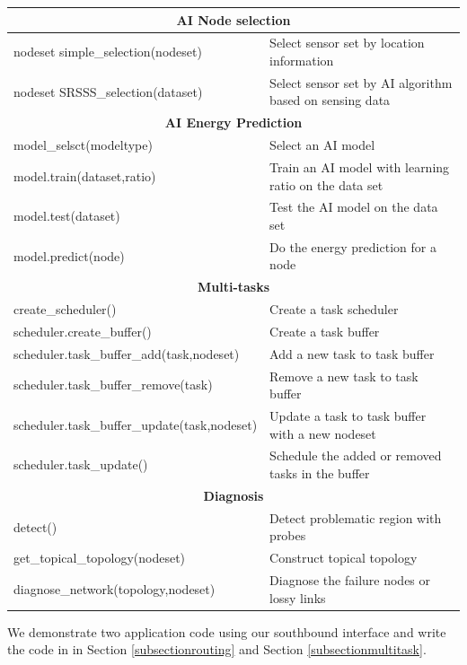 \begin{table}[!b]
{\begin{tabular}{|l|l|}
		\hline
		\multicolumn{2}{|c|}{\textbf{AI Node selection}}\\
		\hline
		\hline
		nodeset simple\_selection(nodeset) & Select sensor set by location information\\
		\hline
		nodeset SRSSS\_selection(dataset) & Select sensor set by AI algorithm based on sensing data\\
		\hline
		\multicolumn{2}{|c|}{\textbf{AI Energy Prediction}}\\
		\hline
		\hline
		model\_selsct(modeltype) & Select an AI model\\
		\hline
		model.train(dataset,ratio) & Train an AI model with learning ratio on the data set\\
		\hline
		model.test(dataset) & Test the AI model on the data set\\
		\hline
		model.predict(node) & Do the energy prediction for a node \\
		\hline
		\multicolumn{2}{|c|}{\textbf{Multi-tasks}}\\
		\hline
		\hline
		create\_scheduler() & Create a task scheduler \\
		\hline
		scheduler.create\_buffer() & Create a task buffer \\
		\hline
		scheduler.task\_buffer\_add(task,nodeset) & Add a new task to task buffer \\
		\hline
		scheduler.task\_buffer\_remove(task) & Remove a new task to task buffer \\
		\hline
		scheduler.task\_buffer\_update(task,nodeset) & Update a task to task buffer with a new nodeset \\
		\hline
		scheduler.task\_update() & Schedule the added or removed tasks in the buffer\\
		\hline
		\multicolumn{2}{|c|}{\textbf{Diagnosis}}\\
		\hline
		\hline
		detect() & Detect problematic region with probes \\
		\hline
		get\_topical\_topology(nodeset) & Construct topical topology\\
		\hline
		diagnose\_network(topology,nodeset) & Diagnose the failure nodes or lossy links\\
		\hline
	\end{tabular}
	}
\end{table}

We demonstrate two application code using our southbound interface and write the code in in Section \ref{subsectionrouting} and Section \ref{subsectionmultitask}.

